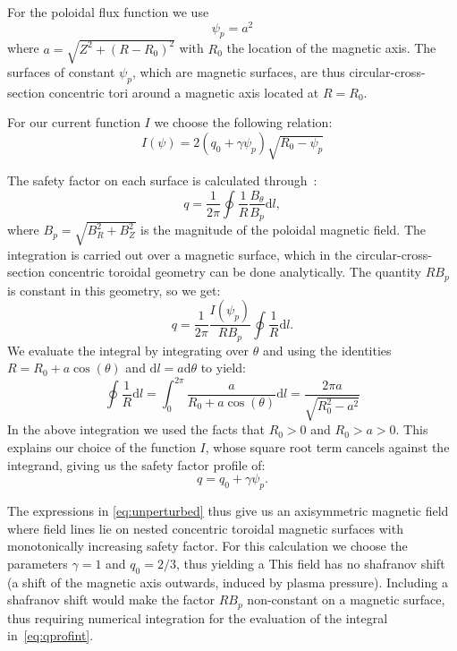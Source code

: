 \documentclass[%
superscriptaddress,
amsmath,amssymb,
aps,
pre,
floatfix,
]{revtex4-2}
\begin{document}
For the poloidal flux function we use
\begin{equation}
  \psi_p = a^2
\end{equation}
where $a=\sqrt{Z^2 + (R-R_0)^2}$ with $R_0$ the location of the magnetic axis.
The surfaces of constant $\psi_p$, which are magnetic surfaces, are thus circular-cross-section concentric tori around a magnetic axis located at $R=R_0$.

For our current function $I$ we choose the following relation:
\begin{equation}
  I(\psi) = 2(q_0 + \gamma \psi_p)\sqrt{R_0-\psi_p}
\end{equation}


The safety factor on each surface is calculated through~\cite{wesson2011tokamaks}:
\begin{equation}\label{eq:qprofint}
  q=\frac{1}{2\pi} \oint \frac{1}{R}\frac{B_\theta}{B_p}\mathrm{d} l,
\end{equation}
where $B_p=\sqrt{B_R^2+B_Z^2}$ is the magnitude of the poloidal magnetic field.
The integration is carried out over a magnetic surface, which in the circular-cross-section concentric toroidal geometry can be done analytically.
The quantity $R B_p$ is constant in this geometry, so we get:
\begin{equation}
  q = \frac{1}{2\pi} \frac{I(\psi_p)}{RB_p}\oint \frac{1}{R} \mathrm{d}l.
\end{equation}
We evaluate the integral by integrating over $\theta$ and using the identities $R=R_0 +a \cos(\theta)$ and $\mathrm{d}l = a \mathrm{d}\theta$ to yield:
\begin{equation}
  \oint \frac{1}{R} \mathrm{d}l = \int_0^{2\pi} \frac{a}{R_0 + a \cos(\theta)} \mathrm{d}l =
  \frac{2\pi a}{\sqrt{R_0^2 -a^2}}
\end{equation}
In the above integration we used the facts that $R_0>0$ and $R_0>a>0$.
This explains our choice of the function $I$, whose square root term cancels against the integrand, giving us the safety factor profile of:
\begin{equation}
  q=q_0 + \gamma \psi_p.
\end{equation}

The expressions in \ref{eq:unperturbed} thus give us an axisymmetric magnetic field where field lines lie on nested concentric toroidal magnetic surfaces with monotonically increasing safety factor.
For this calculation we choose the parameters $\gamma=1$ and $q_0=2/3$, thus yielding a
This field has no shafranov shift (a shift of the magnetic axis outwards, induced by plasma pressure).
Including a shafranov shift would make the factor $RB_p$ non-constant on a magnetic surface, thus requiring numerical integration for the evaluation of the integral in~\ref{eq:qprofint}.
\end{document}
